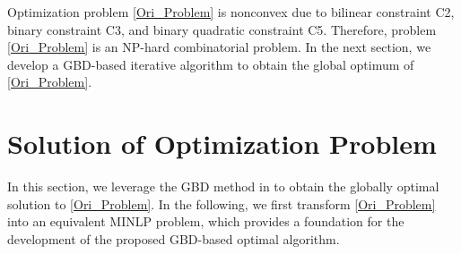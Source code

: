 \documentclass[12pt, draftclsnofoot, onecolumn]{IEEEtran}
\begin{document}
Optimization problem \eqref{Ori_Problem} is nonconvex due to bilinear constraint C2, binary constraint C3, and binary quadratic constraint C5. Therefore, problem \eqref{Ori_Problem} is an NP-hard combinatorial problem. %
In the next section, we develop a GBD-based iterative algorithm to obtain the global optimum of \eqref{Ori_Problem}.

\section{Solution of Optimization Problem}
In this section, we leverage the GBD method in \cite{geoffrion1972generalized} to obtain the globally optimal solution to \eqref{Ori_Problem}. In the following, we first transform \eqref{Ori_Problem} into an equivalent MINLP problem, which provides a foundation for the development of the proposed GBD-based optimal algorithm.
\end{document}
